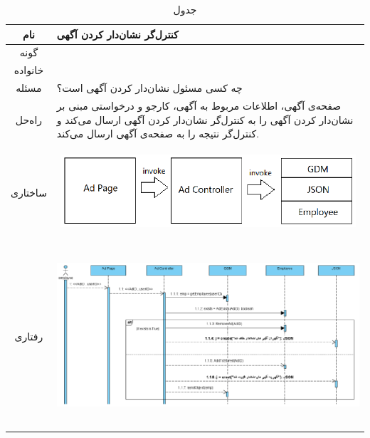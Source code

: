 \begin{table}[H]
	\begin{adjustbox}{width=\textwidth}
		\begin{tabular}{|c|p{\textwidth}|}
			\hline
			نام &
			کنترل‌گر نشان‌دار کردن آگهی \\ 
			\hline
			گونه & 
			\grasp \\
			\hline
			خانواده &
			\controller \\
			\hline
			مسئله & 
			چه کسی مسئول نشان‌دار کردن آگهی است؟\\
			\hline
			راه‌حل& 
			صفحه‌ی آگهی، اطلاعات مربوط به آگهی، کارجو و درخواستی مبنی بر نشان‌دار کردن آگهی را به کنترل‌گر نشان‌دار کردن آگهی ارسال می‌کند و کنترل‌گر نتیجه را به صفحه‌ی آگهی ارسال می‌کند. \\
			\hline
			ساختاری & 
			\begin{minipage}{\textwidth}
				\begin{flushleft}
					\begin{minipage}{\textwidth}
						\includegraphics[width=13cm, height=2.7cm]{./images/7-4-1}
					\end{minipage}
				\end{flushleft}
			\end{minipage}
			
			\\
			\hline
			رفتاری & 
			\begin{minipage}{\textwidth}
				\begin{flushleft}
					\begin{minipage}{\textwidth}
						\includegraphics[width=13.5cm, height=6cm]{./images/7-4-2}
					\end{minipage}
				\end{flushleft}
			\end{minipage}
			\\
			\hline
		\end{tabular}
	\end{adjustbox}
	\caption{جدول }
	\label{table-with-pic:4}
\end{table}

